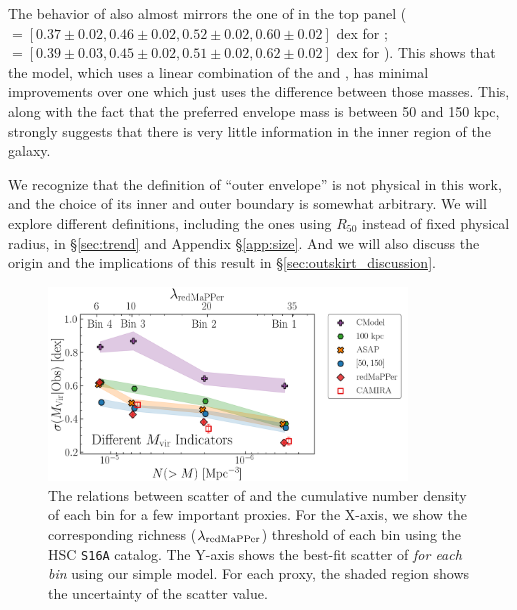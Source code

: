 \documentclass[fleqn,usenatbib,useAMS,english]{mnras}
\begin{document}
    The behavior of  also almost mirrors the one of \masap{} in the
    top panel (\sigmvir{}$=[0.37\pm0.02, 0.46\pm0.02, 0.52\pm0.02, 0.60\pm0.02]$ dex for
    ; $=[0.39\pm0.03, 0.45\pm0.02, 0.51\pm0.02, 0.62\pm0.02]$ dex for \masap{}).
    This shows that the \asap{} model, which uses a linear combination of the 
    and , has minimal improvements over one which just uses the difference between
    those masses. This, along with the fact that the preferred envelope mass is between 50 and
    150 kpc, strongly suggests that there is very little information in the inner region of the
    galaxy.

    We recognize that the definition of ``outer envelope'' is not physical in this work, and
    the choice of its inner and outer boundary is somewhat arbitrary.
    We will explore different definitions, including the ones using $R_{50}$ instead of fixed
    physical radius, in \S \ref{sec:trend} and Appendix \S \ref{app:size}.
    And we will also discuss the origin and the implications of this result in
    \S \ref{sec:outskirt_discussion}.

  \begin{figure}
      \centering
      \includegraphics[width=0.85\textwidth]{figure/topn_fig_9a}
      \caption{
          The relations between scatter of \mvir{} and the cumulative number density of each
          \topn{} bin for a few important \mhalo{} proxies. For the X-axis, we show the corresponding
          richness ($\lambda_{\rm redMaPPer}$) threshold of each bin using the HSC \texttt{S16A}
          \redm{} catalog. The Y-axis shows the best-fit scatter of \logmvir{} \emph{for each
          bin} using our simple model. For each \mhalo{} proxy, the shaded region shows the
          uncertainty of the scatter value.
      }
      \label{fig:scatter_trend}
  \end{figure}
\end{document}
